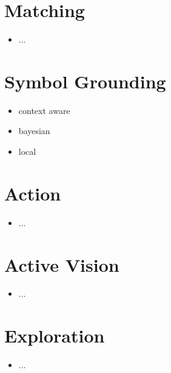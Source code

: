 \documentclass{article}
\begin{document}
	\section{Matching}
	
	\begin{itemize}
		\item ...
	\end{itemize}

	\section{Symbol Grounding}
	
	\begin{itemize}
		\item context aware
		\item bayesian
		\item local
	\end{itemize}
	
	\section{Action}
	
	\begin{itemize}
		\item ...
	\end{itemize}
	
	\section{Active Vision}
	
	\begin{itemize}
		\item ...
	\end{itemize}
	
	\section{Exploration}
	
	\begin{itemize}
		\item ...
	\end{itemize}
		
	\clearpage
	
	
	
	\clearpage
	
	
	
	
\end{document}
